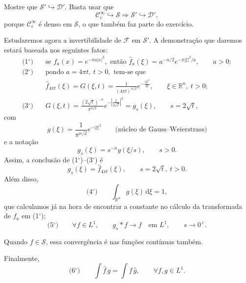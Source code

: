 \documentclass[../distribution_theory_notes.tex]{subfiles}
\begin{document}
\begin{exr}
	Mostre que \(\mathcal{S}'\hookrightarrow \mathcal{D}'\). Basta usar que
	\[
		\mathcal{C}_{c}^{\infty}\hookrightarrow \mathcal{S}
		\Longrightarrow \mathcal{S}'\hookrightarrow \mathcal{D}',
	\]
	porque \(\mathcal{C}_{c}^{\infty}\) é denso em \(\mathcal{S}\), o que também faz parte do exercício.
\end{exr}

Estudaremos agora a invertibilidade de \(\mathcal{F}\) em \(\mathcal{S}'\). A demonstração que daremos estará baseada nos seguintes fatos:
\begin{align*}
	\text{(1\(^\circ\))}\quad &
	\text{se }f_{a}(x)=e^{-\pi a|x|^{2}},\text{ então }
	\hat{f}_{a}(\xi )=a^{-n/2}e^{-\pi |\xi |^{2}/a},\qquad a>0; \\[0.4em]
	\text{(2\(^\circ\))}\quad &
	\text{pondo }a=4\pi t,\ t>0,\text{ tem-se que}              \\[-0.2em]
	                          & \hat{f}_{4\pi t}(\xi )
	=G(\xi ,t)
	=\frac{1}{(4\pi t)^{n/2}}e^{-\frac{|\xi |^{2}}{4t}},
	\qquad \xi \in \mathbb{R}^{n},\ t>0;                        \\[0.4em]
	\text{(3\(^\circ\))}\quad &
	G(\xi ,t)
	=\frac{(2\sqrt{t})^{-n}}{\pi ^{n/2}}
	e^{-\left|\frac{\xi }{2\sqrt{t}}\right|^{2}}
	=g_{s}(\xi ),
	\qquad s=2\sqrt{t},
\end{align*}
com
\[
	g(\xi )=\frac{1}{\pi ^{n/2}}e^{-|\xi |^{2}}
	\qquad \text{(núcleo de Gauss--Weierstrass)}
\]
e a notação
\[
	g_{s}(\xi )=s^{-n}g(\xi /s),\qquad s>0.
\]
Assim, a conclusão de (1\(^\circ\))--(3\(^\circ\)) é
\[
	g_{s}(\xi )=\hat{f}_{4\pi t}(\xi ),
	\qquad s=2\sqrt{t},\ t>0.
\]
Além disso,
\[
	\text{(4\(^\circ\))}\qquad \int_{\mathbb{R}^{n}}g(\xi )\,\mathrm{d}\xi =1,
\]
que calculamos já na hora de encontrar a constante no cálculo da transformada de \(f_{a}\) em (1\(^\circ\));
\[
	\text{(5\(^\circ\))}\qquad
	\forall f\in L^{1},\qquad g_{s}*f\longrightarrow f
	\quad \text{em }L^{1},\qquad s\to 0^{+}.
\]

\begin{tcolorbox}[
		skin=enhanced,
		title=Observação,
		fonttitle=\bfseries,
		colframe=black,
		colbacktitle=cyan!75!white,
		colback=cyan!15,
		colbacklower=black,
		coltitle=black,
		drop fuzzy shadow
	]
	Quando \(f\in \mathcal{S}\), essa convergência é nas funções contínuas também.
\end{tcolorbox}

Finalmente,
\[
	\text{(6\(^\circ\))}\qquad
	\int \hat{f}\,g=\int f\,\hat{g},
	\qquad \forall f,g\in L^{1}.
\]
\end{document}
